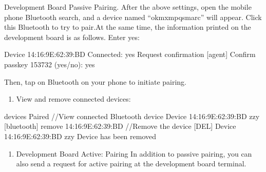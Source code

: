 \documentclass[letterpaper,10pt,openany,english]{sphinxmanual}
\begin{document}
\sphinxAtStartPar
Development Board Passive Pairing. After the above settings, open the mobile phone Bluetooth search, and a device named “ok\sphinxhyphen{}mxmpq\sphinxhyphen{}smarc” will appear. Click this Bluetooth to try to pair.At the same time, the information printed on the development board is as follows. Enter yes:

\begin{sphinxVerbatim}[commandchars=\\\{\}]
[CHG] Device 14:16:9E:62:39:BD Connected: yes
Request confirmation
[agent] Confirm passkey 153732 (yes/no): yes
\end{sphinxVerbatim}

\sphinxAtStartPar
Then, tap on Bluetooth on your phone to initiate pairing.
\begin{enumerate}
%
\setcounter{enumi}{1}
\item {} 
\sphinxAtStartPar
View and remove connected devices:

\end{enumerate}

\begin{sphinxVerbatim}[commandchars=\\\{\}]
[bluetooth]\PYGZsh{} devices Paired                                //View connected Bluetooth device
Device 14:16:9E:62:39:BD zzy
[bluetooth]\PYGZsh{} remove 14:16:9E:62:39:BD                         //Remove the device
[DEL] Device 14:16:9E:62:39:BD zzy
Device has been removed
\end{sphinxVerbatim}
\begin{enumerate}
%
\setcounter{enumi}{2}
\item {} 
\sphinxAtStartPar
Development Board Active: Pairing In addition to passive pairing, you can also send a request for active pairing at the development board terminal.

\end{enumerate}
\end{document}
